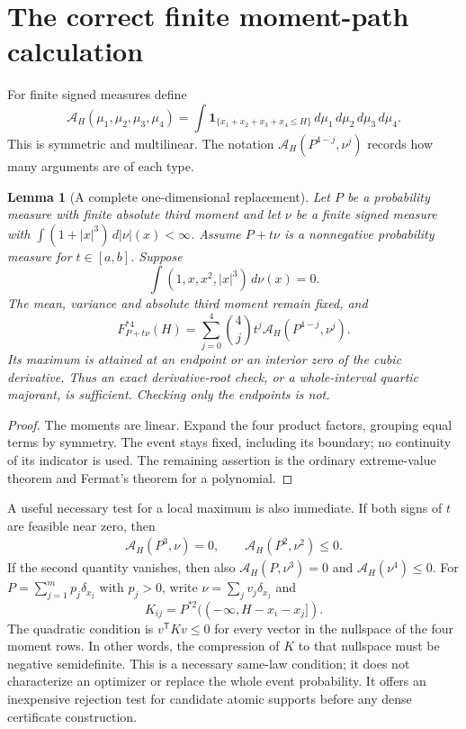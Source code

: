 \documentclass[11pt,a4paper]{article}
\newtheorem{lemma}[theorem]{Lemma}
\begin{document}
\section{The correct finite moment-path calculation}
For finite signed measures define
\[
 \mathcal A_H(\mu_1,\mu_2,\mu_3,\mu_4)
  =\int\mathbf1_{\{x_1+x_2+x_3+x_4\le H\}}
                         \,d\mu_1\,d\mu_2\,d\mu_3\,d\mu_4.
\]
This is symmetric and multilinear. The notation
$\mathcal A_H(P^{4-j},\nu^j)$ records how many arguments are of each type.

\begin{lemma}[A complete one-dimensional replacement]\label{lem:path}
Let $P$ be a probability measure with finite absolute third moment and
let $\nu$ be a finite signed measure with
$\int(1+|x|^3)\,d|\nu|(x)<\infty$. Assume $P+t\nu$ is a nonnegative
probability measure for $t\in[a,b]$. Suppose
\[
 \int(1,x,x^2,|x|^3)\,d\nu(x)=0.
\]
The mean, variance and absolute third moment remain fixed, and
\begin{equation}\label{eq:expansion}
 F_{P+t\nu}^{*4}(H)=
 \sum_{j=0}^4\binom4j t^j\mathcal A_H(P^{4-j},\nu^j).
\end{equation}
Its maximum is attained at an endpoint or an interior zero of the cubic
 derivative. Thus an exact derivative-root check, or a whole-interval
quartic majorant, is sufficient. Checking only the endpoints is not.
\end{lemma}
\begin{proof}
The moments are linear. Expand the four product factors, grouping equal
terms by symmetry. The event stays fixed, including its boundary; no
continuity of its indicator is used. The remaining assertion is the
ordinary extreme-value theorem and Fermat's theorem for a polynomial.
\end{proof}

A useful necessary test for a local maximum is also immediate. If both
signs of $t$ are feasible near zero, then
\begin{gather*}
 \mathcal A_H(P^3,\nu)=0,\qquad
 \mathcal A_H(P^2,\nu^2)\le0.
\end{gather*}
If the second quantity vanishes, then also
$\mathcal A_H(P,\nu^3)=0$ and $\mathcal A_H(\nu^4)\le0$.
For $P=\sum_{j=1}^m p_j\delta_{x_j}$ with $p_j>0$, write
$\nu=\sum_jv_j\delta_{x_j}$ and
\[
 K_{ij}=P^{*2}(( -\infty,H-x_i-x_j]).
\]
The quadratic condition is $v^\mathsf TKv\le0$ for every vector in
the nullspace of the four moment rows. In other words, the compression
of $K$ to that nullspace must be negative semidefinite. This is a necessary
same-law condition; it does not characterize an optimizer or replace the
whole event probability. It offers an inexpensive rejection test for
candidate atomic supports before any dense certificate construction.
\end{document}
